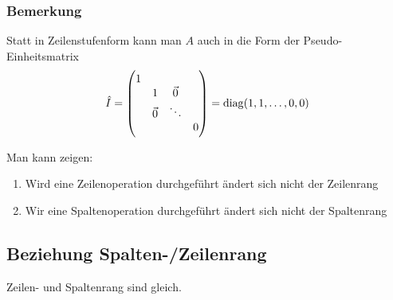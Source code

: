 \subsubsection{Bemerkung}
Statt in Zeilenstufenform kann man $A$ auch in die Form der Pseudo-Einheitsmatrix
\begin{equation*}
    \hat{I} =
    \begin{pmatrix}
        1  \\
        & 1 & \vec{0} &  \\
        & \vec{0} & \ddots \\
        &  & & 0
    \end{pmatrix} = \operatorname{diag}(1, 1, \ldots, 0, 0)
\end{equation*}

Man kann zeigen:
\begin{enumerate}
    \item Wird eine Zeilenoperation durchgeführt ändert sich nicht der
        Zeilenrang
    \item Wir eine Spaltenoperation durchgeführt ändert sich nicht der
        Spaltenrang
\end{enumerate}

\subsection{Beziehung Spalten-/Zeilenrang}
Zeilen- und Spaltenrang sind gleich.
